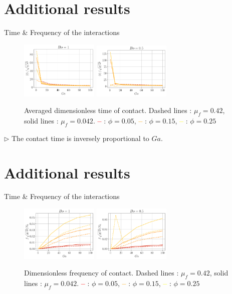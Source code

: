\documentclass{sintefbeamer}
\begin{document}
\section*{Additional results}
\begin{frame}{Time \& Frequency of the interactions}  
  \begin{figure}[h!]
    \centering
    \includegraphics[width=0.33\textwidth]{image/N_10/time/Tcm_Bo_1.pdf}
    \includegraphics[width=0.33\textwidth]{image/N_10/time/Tcm_Bo_0_5.pdf}
    \caption{Averaged dimensionless time of contact. Dashed lines : $\mu_f = 0.42$, solid lines : $\mu_f = 0.042$. \textcolor{red}{\textbf{--}} : $\phi = 0.05$, \textcolor{orange}{\textbf{--}} : $\phi = 0.15$, \textcolor{yellow}{\textbf{--}} : $\phi = 0.25$} 
\end{figure} 
$\triangleright$ The contact time is inversely proportional to $Ga$. 
\end{frame}
\section*{Additional results}
\begin{frame}{Time \& Frequency of the interactions}  
  \begin{figure}[h!]
    \centering
    \includegraphics[width=0.33\textwidth]{image/N_10/freq/HzG_Bo_1.pdf}
    \includegraphics[width=0.33\textwidth]{image/N_10/freq/HzG_Bo_0_5.pdf}
    \caption{Dimensionless frequency of contact. Dashed lines : $\mu_f = 0.42$, solid lines : $\mu_f = 0.042$. \textcolor{red}{\textbf{--}} : $\phi = 0.05$, \textcolor{orange}{\textbf{--}} : $\phi = 0.15$, \textcolor{yellow}{\textbf{--}} : $\phi = 0.25$} 
\end{figure} 
\end{frame}

\backmatter
\end{document}
